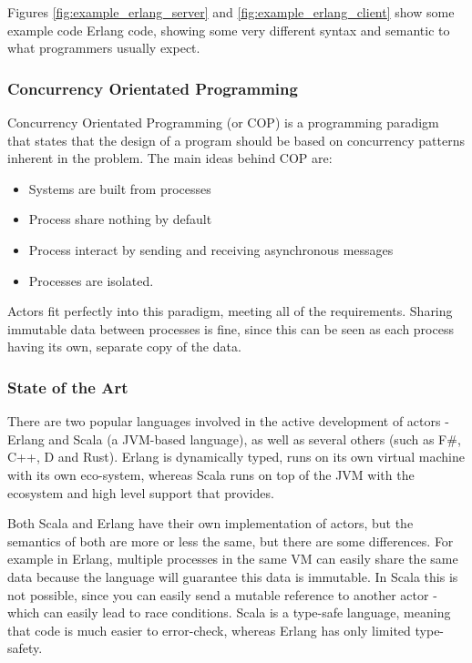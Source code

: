 \documentclass{article}
\begin{document}
Figures \ref{fig:example_erlang_server} and \ref{fig:example_erlang_client} show
some example code Erlang code, showing some very different syntax and semantic
to what programmers usually expect.

\subsubsection{Concurrency Orientated Programming}
Concurrency Orientated Programming\cite{armstrong2007} (or COP) is a programming paradigm that 
states that the design of a program should be based on concurrency patterns
inherent in the problem. The main ideas behind COP are:
\begin{itemize}
\item Systems are built from processes
\item Process share nothing by default
\item Process interact by sending and receiving asynchronous messages
\item Processes are isolated.
\end{itemize}

Actors fit perfectly into this paradigm, meeting all of the requirements. Sharing immutable data
between processes is fine, since this can be seen as each process having its own, separate
copy of the data.

\subsubsection{State of the Art}

There are two popular languages involved in the active development of actors -
Erlang and Scala (a JVM-based language), as well as several others (such as F\#,
C++, D and Rust). Erlang is dynamically typed, runs on its own virtual machine
with its own eco-system, whereas Scala runs on top of the JVM with the ecosystem
and high level support that provides.

Both Scala and Erlang have their own implementation of actors, but the semantics
of both are more or less the same, but there are some differences. For example
in Erlang, multiple processes in the same VM can easily share the same data
because the language will guarantee this data is immutable. In Scala this is not
possible, since you can easily send a mutable reference to another actor - which
can easily lead to race conditions. Scala is a type-safe language, meaning that
code is much easier to error-check, whereas Erlang has only limited type-safety.
\end{document}
